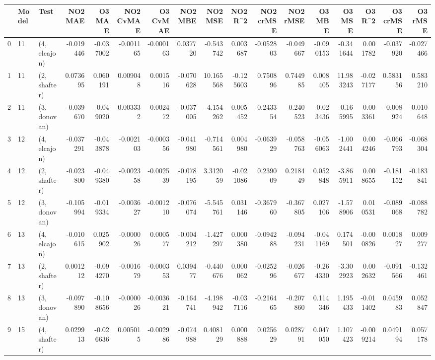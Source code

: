 \begin{tabular}{lllrrrrrrrrrrrrrr}
\toprule
{} & Model &          Test &   NO2 MAE &    O3 MAE &  NO2 CvMAE &  O3 CvMAE &   NO2 MBE &    NO2 MSE &   NO2 R\textasciicircum2 &  NO2 crMSE &  NO2 rMSE &    O3 MBE &     O3 MSE &    O3 R\textasciicircum2 &  O3 crMSE &   O3 rMSE \\
\midrule
0  &    11 &  (4, elcajon) & -0.019446 & -0.037002 &  -0.001165 & -0.000163 &  0.037720 &  -0.543742 &  0.003687 &  -0.052803 & -0.049667 & -0.090153 &  -0.341644 &  0.001782 & -0.037920 & -0.027466 \\
1  &    11 &  (2, shafter) &  0.073695 &  0.060191 &   0.009048 &  0.001516 & -0.070628 &  10.165568 & -0.125603 &   0.750896 &  0.744985 &  0.008405 &  11.983243 & -0.027177 &  0.583156 &  0.583210 \\
2  &    11 &  (3, donovan) & -0.039670 & -0.049020 &   0.003332 & -0.002472 & -0.037005 &  -4.154262 &  0.005452 &  -0.243354 & -0.240523 & -0.023436 &  -0.165995 &  0.003361 & -0.008924 & -0.010648 \\
3  &    12 &  (4, elcajon) & -0.037291 & -0.043878 &  -0.002103 & -0.000356 & -0.041980 &  -0.714561 &  0.004980 &  -0.063929 & -0.058763 & -0.056063 &  -1.002441 &  0.004246 & -0.066793 & -0.068304 \\
4  &    12 &  (2, shafter) & -0.023800 & -0.049380 &  -0.002358 & -0.002539 & -0.078195 &   3.312059 & -0.021086 &   0.239009 &  0.218449 &  0.052848 &  -3.865911 &  0.008655 & -0.181152 & -0.183841 \\
5  &    12 &  (3, donovan) & -0.105994 & -0.019334 &  -0.003627 & -0.001210 & -0.076074 &  -5.545761 &  0.031146 &  -0.367960 & -0.367805 &  0.027106 &  -1.578906 &  0.010531 & -0.089068 & -0.088782 \\
6  &    13 &  (4, elcajon) & -0.010615 &  0.025902 &  -0.000026 &  0.000577 & -0.004212 &  -1.427297 &  0.000380 &  -0.094288 & -0.094231 & -0.041169 &   0.174501 & -0.000826 &  0.001827 &  0.009277 \\
7  &    13 &  (2, shafter) &  0.001212 & -0.094270 &  -0.001679 & -0.000353 &  0.039477 &  -0.440676 &  0.000062 &  -0.025296 & -0.026677 & -0.264330 &  -3.302923 &  0.002632 & -0.091566 & -0.132461 \\
8  &    13 &  (3, donovan) & -0.097890 & -0.108656 &  -0.000026 & -0.003621 & -0.164741 &  -4.198942 & -0.037116 &  -0.216465 & -0.207860 &  0.114346 &   1.195433 & -0.011402 &  0.045983 &  0.052847 \\
9  &    15 &  (4, shafter) &  0.029913 & -0.026636 &   0.005015 & -0.002986 & -0.074988 &   0.408129 &  0.000888 &   0.025629 &  0.028791 &  0.047050 &   1.107423 & -0.009214 &  0.049194 &  0.057178 \\

\end{tabular}
